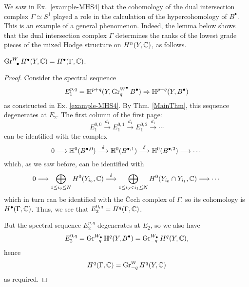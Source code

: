 \documentclass[../main.tex]{subfiles}
\begin{document}
We saw in Ex.~\ref{example-MHS4} that the cohomology of the dual intersection complex $\Gamma \simeq S^1$ played a role in the calculation of the hypercohomology of $B^{\bullet}$. This is an example of a general phenomenon. Indeed, the lemma below shows that the dual intersection complex $\Gamma$ determines the ranks of the lowest grade pieces of the mixed Hodge structure on $H^n(Y,\mathbb{C})$, as follows.

\begin{lemma} 
\label{gradeds-of-Y}
$\operatorname{Gr}_{-\bullet}^W H^\bullet(Y,\mathbb{C})=H^\bullet(\Gamma,\mathbb{C})$.
\end{lemma}

\begin{proof} 
Consider the spectral sequence
\[E_1^{p,q}=\mathbb{H}^{p+q}(Y,\operatorname{Gr}^{W^\bullet}_{q} B^\bullet) \Rightarrow \mathbb{H}^{p+q}(Y,B^\bullet)\]
as constructed in Ex. \ref{example-MHS4}. By Thm. \ref{MainThm}, this sequence degenerates at $E_2$.
The first column of the first page:
\[E_1^{0,0}\stackrel{d_1}{\longrightarrow}  E_1^{0,1}\stackrel{d_1}{\longrightarrow}  E_1^{0,2}\stackrel{d_1}{\longrightarrow} \cdots\]
can be identified with the complex
\[
0\longrightarrow\mathbb{H}^0(B^{\bullet,0})\stackrel{\delta}{\longrightarrow} \mathbb{H}^0(B^{\bullet,1}) \stackrel{\delta}{\longrightarrow}\mathbb{H}^0(B^{\bullet,2}) \longrightarrow \cdots
\]
which, as we saw before, can be identified with
\[
0\longrightarrow 
\bigoplus_{1\le i_0\le N}H^0(Y_{i_0},\mathbb{C})\stackrel{\delta}{\longrightarrow} 
\bigoplus_{1\le i_0<i_1\le N}H^0(Y_{i_0}\cap Y_{i_1},\mathbb{C})
\longrightarrow \cdots\]
which in turn can be identified with the \v{C}ech complex of $\Gamma$, so its cohomology is $H^\bullet(\Gamma,\mathbb{C})$. Thus, we see that $E_2^{0,q} = H^q(\Gamma,\mathbb{C})$.

But the spectral sequence $E_2^{p,q}$ degenerates at $E_2$, so we also have 
\[E_2^{0,q} = \operatorname{Gr}_{-q}^{W_\bullet}\mathbb{H}^q(Y,B^{\bullet}) = \operatorname{Gr}_{-q}^{W_\bullet}H^q(Y,\mathbb{C}),\]
hence 
\[
H^q(\Gamma,\mathbb{C}) = \operatorname{Gr}_{-q}^{W}H^q(Y,\mathbb{C})
\]
as required.\end{proof}
\end{document}
